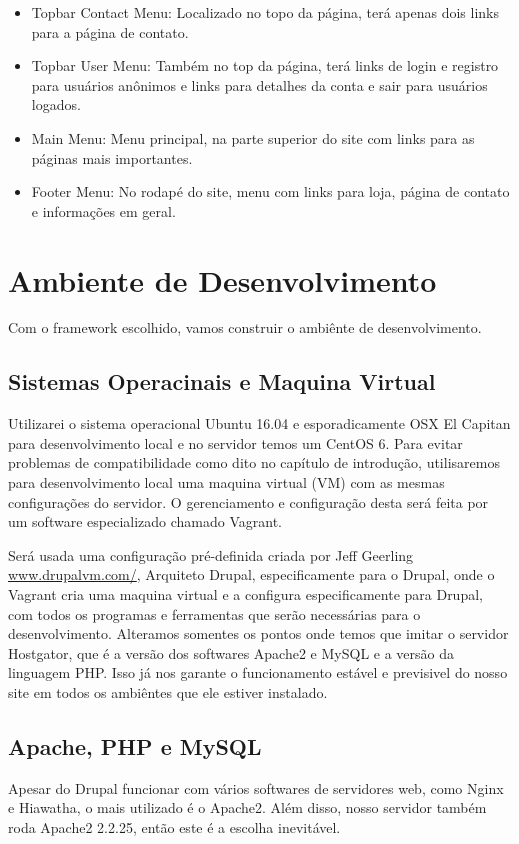 \documentclass[
	12pt,				%
    oneside,			%
	a4paper,			%
	english,			%
	french,				%
	spanish,			%
	brazil				%
	]{abntex2}
\begin{document}
\begin{itemize}
  \item Topbar Contact Menu: Localizado no topo da página, terá apenas dois links para a página de contato.
  \item Topbar User Menu: Também no top da página, terá links de login e registro para usuários anônimos e links para detalhes da conta e sair para usuários logados.
  \item Main Menu: Menu principal, na parte superior do site com links para as páginas mais importantes.
  \item Footer Menu: No rodapé do site, menu com links para loja, página de contato e informações em geral.
\end{itemize}


\section{Ambiente de Desenvolvimento}

Com o framework escolhido, vamos construir o ambiênte de desenvolvimento. 

\subsection{Sistemas Operacinais e Maquina Virtual} 
Utilizarei o sistema operacional Ubuntu 16.04 e esporadicamente OSX El Capitan para desenvolvimento local e no servidor temos um CentOS 6. Para evitar problemas de compatibilidade como dito no capítulo de introdução, utilisaremos para desenvolvimento local uma maquina virtual (VM) com as mesmas configurações do servidor. O gerenciamento e configuração desta será feita por um software especializado chamado Vagrant.

Será usada uma configuração pré-definida criada por Jeff Geerling \url{www.drupalvm.com/}, Arquiteto Drupal, especificamente para o Drupal, onde o Vagrant cria uma maquina virtual e a configura especificamente para Drupal, com todos os programas e ferramentas que serão necessárias para o desenvolvimento. Alteramos somentes os pontos onde temos que imitar o servidor Hostgator, que é a versão dos softwares Apache2 e MySQL e a versão da linguagem PHP. Isso já nos garante o funcionamento estável e previsivel do nosso site em todos os ambiêntes que ele estiver instalado.

\subsection{Apache, PHP e MySQL}
Apesar do Drupal funcionar com vários softwares de servidores web, como Nginx e Hiawatha, o mais utilizado é o Apache2. Além disso, nosso servidor também roda Apache2 2.2.25, então este é a escolha inevitável. 
\end{document}
